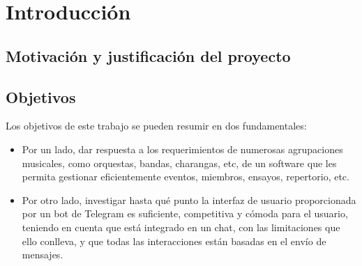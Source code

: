 \chapter{Introducción}

\section{Motivación y justificación del proyecto}



\section{Objetivos}


Los objetivos de este trabajo se pueden resumir en dos fundamentales:

\begin{itemize}
    \item Por un lado, dar respuesta a los requerimientos de numerosas agrupaciones musicales, como orquestas, bandas, charangas, etc, de un software que les permita gestionar eficientemente eventos, miembros, ensayos, repertorio, etc.
    \item Por otro lado, investigar hasta qué punto la interfaz de usuario proporcionada por un bot de Telegram es suficiente, competitiva y cómoda para el usuario, teniendo en cuenta que está integrado en un chat, con las limitaciones que ello conlleva, y que todas las interacciones están basadas en el envío de mensajes.
\end{itemize}


